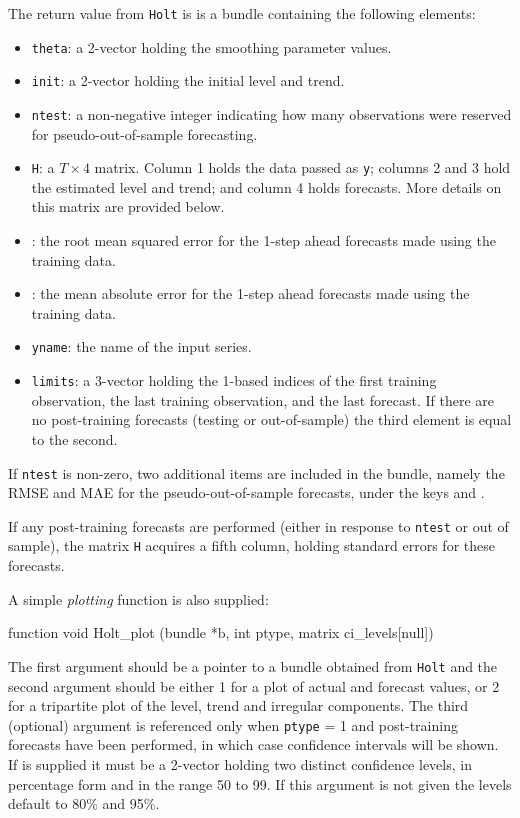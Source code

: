 \documentclass{article}
\begin{document}
The return value from \texttt{Holt} is is a bundle containing the
following elements:
\begin{itemize}
\item \texttt{theta}: a 2-vector holding the smoothing parameter
  values.
\item \texttt{init}: a 2-vector holding the initial level and trend.
\item \texttt{ntest}: a non-negative integer indicating how many
  observations were reserved for pseudo-out-of-sample forecasting.
\item \texttt{H}: a $T \times 4$ matrix.  Column 1 holds the data passed
  as \texttt{y}; columns 2 and 3 hold the estimated level and trend; and
  column 4 holds forecasts. More details on this matrix are provided
  below.
\item {}: the root mean squared error for the 1-step
  ahead forecasts made using the training data.
\item {}: the mean absolute error for the 1-step
  ahead forecasts made using the training data.
\item \texttt{yname}: the name of the input series.
\item \texttt{limits}: a 3-vector holding the 1-based indices of the
  first training observation, the last training observation, and the
  last forecast. If there are no post-training forecasts (testing or
  out-of-sample) the third element is equal to the second.
\end{itemize}
If \texttt{ntest} is non-zero, two additional items are included in the
bundle, namely the RMSE and MAE for the pseudo-out-of-sample forecasts,
under the keys  and .

If any post-training forecasts are performed (either in response to
\texttt{ntest} or out of sample), the matrix \texttt{H} acquires a fifth
column, holding standard errors for these forecasts.

A simple \textit{plotting} function is also supplied:
\begin{nscode}
function void Holt_plot (bundle *b, int ptype, matrix ci_levels[null])
\end{nscode}
The first argument should be a pointer to a bundle obtained from
\texttt{Holt} and the second argument should be either 1 for a plot of
actual and forecast values, or 2 for a tripartite plot of the level,
trend and irregular components. The third (optional) argument is
referenced only when \texttt{ptype} = 1 and post-training forecasts have
been performed, in which case confidence intervals will be shown. If
 is supplied it must be a 2-vector holding two distinct
confidence levels, in percentage form and in the range 50 to 99. If
this argument is not given the levels default to 80\% and 95\%.
\end{document}
